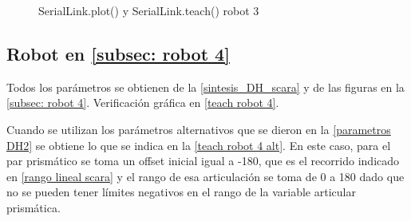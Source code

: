 \documentclass[a4paper,12pt]{article}
\begin{document}
\begin{figure}[htpb]
    \centering
    \begin{adjustbox}{scale = 0.9, max width=\columnwidth}
    \end{adjustbox}
    \caption{SerialLink.plot() y SerialLink.teach() robot 3}
    \label{teach robot 3}
\end{figure}

\subsection{Robot en \cref{subsec: robot 4}}
Todos los parámetros se obtienen de la \cref{sintesis_DH_scara}
y de las figuras en la \cref{subsec: robot 4}. Verificación gráfica en \cref{teach robot 4}.

Cuando se utilizan los parámetros alternativos que se dieron en la \cref{parametros DH2}
se obtiene lo que se indica en la \cref{teach robot 4 alt}.
En este caso, para el par prismático se toma un offset inicial igual a -180, que es el recorrido indicado en
\cref{rango lineal scara} y el rango de esa articulación se toma de 0 a 180 dado que no se pueden tener límites negativos en el rango de la variable articular prismática.
\end{document}
